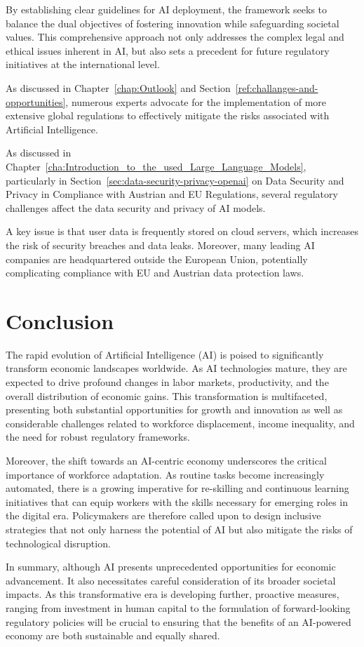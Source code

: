 By establishing clear guidelines for AI deployment, the framework seeks to balance the dual objectives of fostering innovation while safeguarding societal values. This comprehensive approach not only addresses the complex legal and ethical issues inherent in AI, but also sets a precedent for future regulatory initiatives at the international level.
\cite{act-eu-ai}

As discussed in Chapter~\ref{chap:Outlook} and Section~\ref{ref:challanges-and-opportunities}, numerous experts advocate for the implementation of more extensive global regulations to effectively mitigate the risks associated with Artificial Intelligence.


As discussed in Chapter~\ref{cha:Introduction_to_the_used_Large_Language_Models}, particularly in Section~\ref{sec:data-security-privacy-openai} on Data Security and Privacy in Compliance with Austrian and EU Regulations, several regulatory challenges affect the data security and privacy of AI models.

A key issue is that user data is frequently stored on cloud servers, which increases the risk of security breaches and data leaks. Moreover, many leading AI companies are headquartered outside the European Union, potentially complicating compliance with EU and Austrian data protection laws.


\section{Conclusion}
\label{sec:conclusion}

The rapid evolution of Artificial Intelligence (AI) is poised to significantly transform economic landscapes worldwide. 
As AI technologies mature, they are expected to drive profound changes in labor markets, productivity, and the overall distribution of economic gains. 
This transformation is multifaceted, presenting both substantial opportunities for growth and innovation as well as considerable challenges related to workforce displacement,
income inequality, and the need for robust regulatory frameworks.

Moreover, the shift towards an AI-centric economy underscores the critical importance of workforce adaptation. 
As routine tasks become increasingly automated, there is a growing imperative for re-skilling and continuous learning initiatives that can equip workers with the skills 
necessary for emerging roles in the digital era. Policymakers are therefore called upon to design inclusive strategies that not only harness the potential 
of AI but also mitigate the risks of technological disruption.

In summary, although AI presents unprecedented opportunities for economic advancement.
It also necessitates careful consideration of its broader societal impacts. As this transformative era is developing further, 
proactive measures, ranging from investment in human capital to the formulation of forward-looking regulatory policies 
will be crucial to ensuring that the benefits of an AI-powered economy are both sustainable and equally shared.
